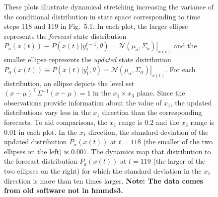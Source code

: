 \documentclass[prelim,showlabels]{book}
\newcommand{\NormalE}[3]{{\mathcal{N}}\left.\left(#1,#2\right)\right|_{#3}}
\newcommand{\transpose}{^\top}
\newcommand{\ti}[2]{{#1}{(#2)}}                  %
\newcommand{\ts}[3]{#1_{#2}^{#3}}                    %
\begin{document}
\begin{figure}[htbp]
  \caption[Dynamical stretching increases state variance.]%
  {These plots illustrate dynamical stretching increasing the variance
    of the conditional distribution in state space corresponding to
    time steps 118 and 119 in Fig.~5.1.  In each plot, the larger
    ellipse represents the \emph{forecast} state distribution $P_{a}
    \left(\ti{x}{t} \right) \equiv P
    \left(\ti{x}{t}|\ts{y}{1}{t-1},\theta \right) =
    \NormalE{\mu_a}{\Sigma_a}{\ti{x}{t}}$ and the smaller ellipse
    represents the \emph{updated} state distribution $P_{\alpha}
    \left(\ti{x}{t} \right) \equiv P \left(\ti{x}{t}|\ts{y}{1}{t},
      \theta \right) =
    \NormalE{\mu_\alpha}{\Sigma_\alpha}{\ti{x}{t}}$.  For each
    distribution, an ellipse depicts the level set $(x-\mu)\transpose
    \Sigma^{-1} (x-\mu) =1$ in the $x_1\times x_3$ plane.  Since the
    observations provide information about the value of $x_1$, the
    updated distributions vary less in the $x_1$ direction than the
    corresponding forecasts.  To aid comparisons, the $x_1$ range is
    $0.2$ and the $x_3$ range is $0.01$ in each plot.  In the $x_1$
    direction, the standard deviation of the updated distribution
    $P_{\alpha}(\ti{x}{t})$ at $t=118$ (the smaller of the two
    ellipses on the left) is 0.007.  The dynamics map that
    distribution to the forecast distribution $P_{a}(\ti{x}{t})$ at
    $t=119$ (the larger of the two ellipses on the right) for which
    the standard deviation in the $x_1$ direction is more than ten
    times larger.  \textbf{Note: The data comes from old software not
      in hmmds3.}}
  \label{fig:ToyStretch}
\end{figure}
\end{document}
